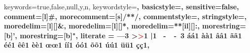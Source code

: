 \expandafter\expandafter\expandafter\lstdefinelanguage
\expandafter{\language@yaml}
{
  keywords={true,false,null,y,n},
  keywordstyle=\color{darkgray}\bfseries,
  basicstyle=\YAMLkeystyle\small,                                 %
  sensitive=false,
  comment=[l]{\#},
  morecomment=[s]{/*}{*/},
  commentstyle=\color{purple}\ttfamily,
  stringstyle=\YAMLvaluestyle\ttfamily,
  moredelim=[l][\color{orange}]{\&},
  moredelim=[l][\color{magenta}]{*},
  moredelim=**[il][\YAMLcolonstyle{:}\YAMLvaluestyle]{:},   %
  morestring=[b]',
  morestring=[b]",
  literate =    {---}{{\ProcessThreeDashes}}3
                {>}{{\textcolor{red}\textgreater}}1     
                {|}{{\textcolor{red}\textbar}}1 
                {\ -\ }{{\mdseries\ -\ }}3
  {á}{{\'a}}1
  {à}{{\`a}}1
  {â}{{\^a}}1
  {ã}{{\~a}}1
  {é}{{\'e}}1
  {ê}{{\^e}}1
  {è}{{\`e}}1
  {œ}{{\oe{}}}1
  {í}{{\'i}}1
  {ó}{{\'o}}1
  {õ}{{\~o}}1
  {ú}{{\'u}}1
  {ü}{{\"u}}1
  {ç}{{\c{c}}}1,
}

\makeatother

\newcommand\ProcessThreeDashes{\llap{\color{cyan}\mdseries-{-}-}}
